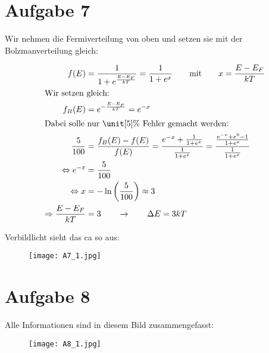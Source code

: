 \section{Aufgabe 7}

Wir nehmen die Fermiverteilung von oben und setzen sie mit der Bolzmanverteilung gleich:

\begin{align*}
f(E) &= \frac{1}{1 + e^{\frac{E - E_F}{kT}}} = \frac{1}{1 + e^x} \qquad \text{mit} \qquad x = \frac{E - E_F}{kT} \\
\intertext{Wir setzen gleich:}
f_B(E) &= e^{- \frac{E - E_F}{kT}} = e^{-x} \\
\intertext{Dabei solle nur $\unit[5]{\%}$ Fehler gemacht werden:}
\frac{5}{100} &= \frac{f_B(E) - f(E)}{f(E)} = \frac{e^{-x} + \frac{1}{1 + e^x}}{\frac{1}{1 + e^x}} = \frac{\frac{e^{-x} + e^0 - 1}{1 + e^x}}{\frac{1}{1 + e^x}} \\
\Leftrightarrow e^{-x} &= \frac{5}{100} \\
\Leftrightarrow x &= - \ln\left( \frac{5}{100} \right) \approx 3 \\
\Rightarrow \frac{E - E_F}{kT} &= 3 \qquad \rightarrow \qquad \Delta E = 3kT
\end{align*}


Verbildlicht sieht das ca so aus:

\begin{figure}[h]
	\centering
	\texttt{[image: A7\_1.jpg]}
\end{figure}


\newpage

\section{Aufgabe 8}

Alle Informationen sind in diesem Bild zusammengefasst:

\begin{figure}[h]
	\centering
	\texttt{[image: A8\_1.jpg]}
\end{figure}











